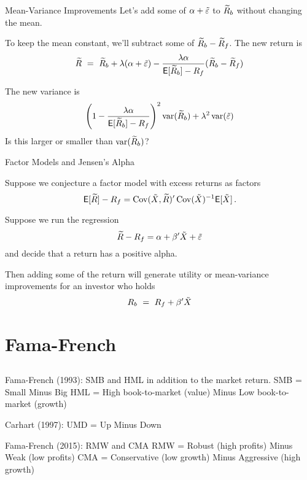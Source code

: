 
\begin{frame}{Mean-Variance Improvements}
Let's add some of $\alpha+\tilde{\varepsilon}$ to $\widetilde{R}_b$ without changing the mean.

To keep the mean constant, we'll subtract some of $\widetilde{R}_b-\widetilde{R}_f$.  The new return is
$$\widetilde{R} \ = \ \widetilde{R}_b + \lambda(\alpha+\tilde{\varepsilon}) - \frac{\lambda\alpha}{\mathsf{E}[\widetilde{R}_b]-R_f}(\widetilde{R}_b-\widetilde{R}_f)$$

The new variance is
$$\left(1-\frac{\lambda\alpha}{\mathsf{E}[\widetilde{R}_b]-R_f}\right)^2\operatorname{var}(\widetilde{R}_b) + \lambda^2\operatorname{var}(\tilde{\varepsilon})$$
Is this larger or smaller than $\operatorname{var}(\widetilde{R}_b)$?
\end{frame}


\begin{frame}{Factor Models and Jensen's Alpha}

Suppose we conjecture a factor model with excess returns as factors
$$\mathsf{E}[\widetilde{R}] - R_f =  \operatorname{Cov}(\tilde{X},\widetilde{R})'\operatorname{Cov}(\tilde{X})^{-1}\mathsf{E}[\tilde{X}]\,.$$

Suppose we run the regression
$$\widetilde{R} - R_f = \alpha + \beta'\tilde{X} + \tilde{\varepsilon}$$
and decide that a return has a positive alpha.

Then adding some of the return will generate utility or mean-variance improvements for an investor who holds 
$$R_b \ = \ R_f + \beta'\tilde{X}$$

\end{frame}


\section{Fama-French}\subsection{}

 Fama-French (1993): SMB and HML in addition to the market return.
\bi
\im SMB = Small Minus Big
\im HML = High book-to-market (value) Minus Low book-to-market (growth)
\ei

Carhart (1997): UMD = Up Minus Down

Fama-French (2015): RMW and CMA
\bi
\im RMW = Robust (high profits) Minus Weak (low profits)
\im CMA = Conservative (low growth) Minus Aggressive (high growth)
\ei


